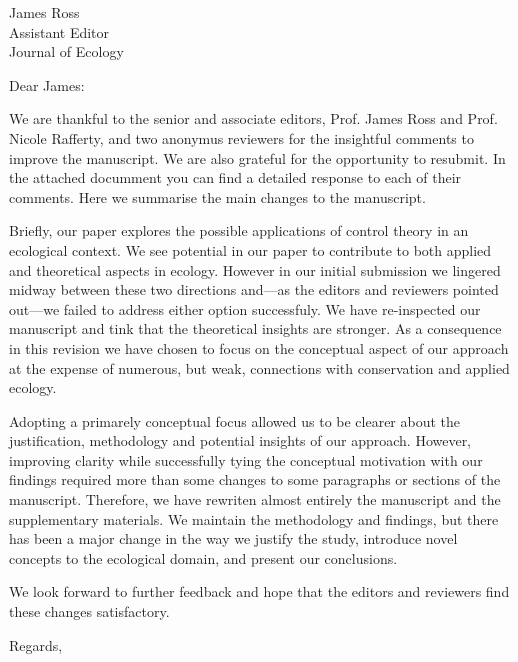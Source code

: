 \documentclass{letter}
\begin{document}
\begin{letter}{James Ross \\ Assistant Editor \\ Journal of Ecology}
\opening{Dear James:}

\onehalfspacing

We are thankful to the senior and associate editors, Prof. James Ross and Prof. Nicole Rafferty, and two anonymus reviewers for the insightful comments to improve the manuscript. 
We are also grateful for the opportunity to resubmit. 
In the attached documment you can find a detailed response to each of their comments. 
Here we summarise the main changes to the manuscript. 

Briefly, our paper explores the possible applications of control theory in an ecological context. 
We see potential in our paper to contribute to both applied and theoretical aspects in ecology. 
However in our initial submission we lingered midway between these two directions and—as the editors and reviewers pointed out—we failed to address either option successfuly.
We have re-inspected our manuscript and tink that the theoretical insights are stronger. 
As a consequence in this revision we have chosen to focus on the conceptual aspect of our approach at the expense of numerous, but weak, connections with conservation and applied ecology.

Adopting a primarely conceptual focus allowed us to be clearer about the justification, methodology and potential insights of our approach. 
However, improving clarity while successfully tying the conceptual motivation with our findings required more than some changes to some paragraphs or sections of the manuscript. 
Therefore, we have rewriten almost entirely the manuscript and the supplementary materials. 
We maintain the methodology and findings, but there has been a major change in the way we justify the study, introduce novel concepts to the ecological domain, and present our conclusions. 

We look forward to further feedback and hope that the editors and reviewers find these changes satisfactory.

\closing{Regards,}
\end{letter}
\end{document}
